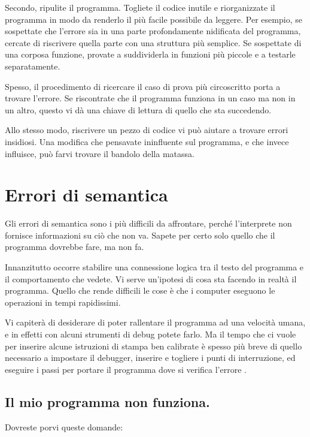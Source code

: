 \documentclass[10pt]{book}
\begin{document}
Secondo, ripulite il programma. Togliete il codice inutile e riorganizzate il programma in modo da renderlo il più facile possibile da leggere. Per esempio, se sospettate che l'errore sia in una parte profondamente nidificata del programma, cercate di riscrivere quella parte con una struttura più semplice. Se sospettate di una corposa funzione, provate a suddividerla in funzioni più piccole e a testarle separatamente.

Spesso, il procedimento di ricercare il caso di prova più circoscritto porta a trovare l'errore. Se riscontrate che il programma funziona in un caso ma non in un altro, questo vi dà una chiave di lettura di quello che sta succedendo.

Allo stesso modo, riscrivere un pezzo di codice vi può aiutare a trovare errori insidiosi. Una modifica che pensavate ininfluente sul programma, e che invece influisce, può farvi trovare il bandolo della matassa.


\section{Errori di semantica}

Gli errori di semantica sono i più difficili da affrontare, perché l'interprete non fornisce informazioni su ciò che non va. Sapete per certo solo quello che il programma dovrebbe fare, ma non fa.

Innanzitutto occorre stabilire una connessione logica tra il testo del programma e il comportamento che vedete. Vi serve un'ipotesi di cosa sta facendo in realtà il programma. Quello che rende difficili le cose è che i computer eseguono le operazioni in tempi rapidissimi. 

Vi capiterà di desiderare di poter rallentare il programma ad una velocità umana, e in effetti con alcuni strumenti di debug potete farlo. Ma il tempo che ci vuole per inserire alcune istruzioni di stampa ben calibrate è spesso più breve di quello necessario a impostare il debugger, inserire e togliere i punti di interruzione, ed eseguire i passi per portare il programma dove si verifica l'errore .

\subsection{Il mio programma non funziona.}

Dovreste porvi queste domande:
\end{document}

